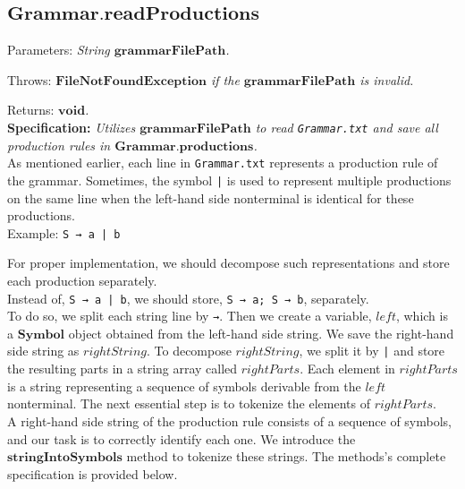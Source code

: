\vspace{30pt}

\subsection{\(\boldsymbol{Grammar.readProductions}\)}

Parameters: \textit{String \(\boldsymbol{grammarFilePath}\).}

Throws: \textit{\(\boldsymbol{FileNotFoundException}\) if the \(\boldsymbol{grammarFilePath}\) is invalid.}

Returns: \textit{\(\boldsymbol{void}\).}\\

\textbf{Specification:} \textit{Utilizes \(\boldsymbol{grammarFilePath}\) to read \texttt{Grammar.txt} and save all production rules in \(\boldsymbol{Grammar.productions}\).}\\

As mentioned earlier, each line in \texttt{Grammar.txt} represents a production rule of the grammar. Sometimes, the symbol \texttt{|} is used to represent multiple productions on the same line when the left-hand side nonterminal is identical for these productions.\\

Example: \texttt{S → a | b}

For proper implementation, we should decompose such representations and store each production separately.\\

Instead of,  \texttt{S → a | b}, we should store,  \texttt{S → a; S → b}, separately.\\

To do so, we split each string line by  \texttt{→}. Then we create a variable, \(left\), which is a \(\boldsymbol{Symbol}\) object obtained from the left-hand side string. We save the right-hand side string as  \(rightString\). To decompose  \(rightString\), we split it by \texttt{|} and store the resulting parts in a string array called \(rightParts\). Each element in \(rightParts\) is a string representing a sequence of symbols derivable from the \(left\) nonterminal. The next essential step is to tokenize the elements of \(rightParts\).\\

A right-hand side string of the production rule consists of a sequence of symbols, and our task is to correctly identify each one. We introduce the \(\boldsymbol{stringIntoSymbols}\) method to tokenize these strings. The methods’s complete specification is provided below.\\

